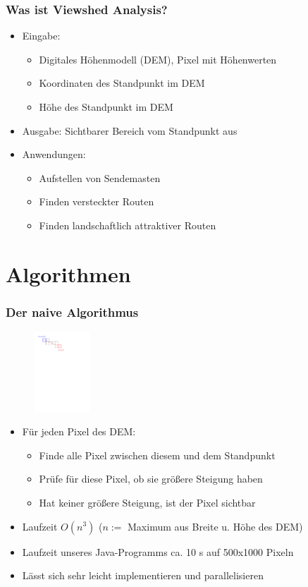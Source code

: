 \documentclass{beamer}
\begin{document}
\begin{frame}
  \frametitle{Was ist Viewshed Analysis?}
  \begin{itemize}[<+->]
    \item Eingabe:
    \begin{itemize}
      \item Digitales Höhenmodell (DEM), Pixel mit Höhenwerten
      \item Koordinaten des Standpunkt im DEM
      \item Höhe des Standpunkt im DEM
    \end{itemize}
    \item Ausgabe: Sichtbarer Bereich vom Standpunkt aus
    \item Anwendungen: 
    \begin{itemize}
      \item Aufstellen von Sendemasten
      \item Finden versteckter Routen
      \item Finden landschaftlich attraktiver Routen
    \end{itemize}
  \end{itemize}
\end{frame}

\section{Algorithmen}

\begin{frame}
  \frametitle{Der naive Algorithmus}
  \begin{figure}[h]
    \centering
    \includegraphics[height=3cm]{naive}
    \label{fig:naive}
  \end{figure}
  \begin{itemize}
    \item Für jeden Pixel des DEM:
    \begin{itemize}
      \item Finde alle Pixel zwischen diesem und dem Standpunkt
      \item Prüfe für diese Pixel, ob sie größere Steigung haben
      \item Hat keiner größere Steigung, ist der Pixel sichtbar
    \end{itemize}
    \item<2-> Laufzeit $O(n^3)$ ($n :=$ Maximum aus Breite u. Höhe des DEM)
    \item<3-> Laufzeit unseres Java-Programms ca. 10 s auf 500x1000 Pixeln
    \item<4-> Lässt sich sehr leicht implementieren und parallelisieren
  \end{itemize}
\end{frame}
\end{document}

